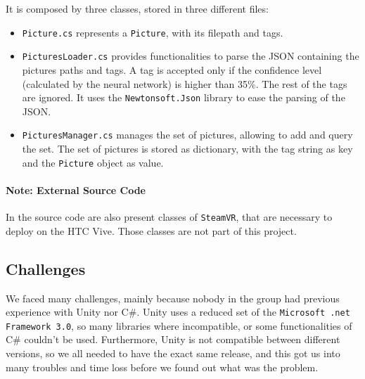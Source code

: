 \documentclass[11pt,a4paper]{article}
\begin{document}
It is composed by three classes, stored in three different files:
\begin{itemize}
\item \texttt{Picture.cs} represents a \texttt{Picture}, with its filepath and tags.
\item \texttt{PicturesLoader.cs} provides functionalities to parse the JSON containing the pictures paths and tags. 
A tag is accepted only if the confidence level (calculated by the neural network) is higher than 35$\%$.
The rest of the tags are ignored.
It uses the \texttt{Newtonsoft.Json} library to ease the parsing of the JSON.
\item \texttt{PicturesManager.cs} manages the set of pictures, allowing to add and query the set. The set of pictures is stored as dictionary, with the tag string as key and the \texttt{Picture} object as value.
\end{itemize}

\paragraph{Note: External Source Code}
In the source code are also present classes of \texttt{SteamVR}, that are necessary to deploy on the HTC Vive.
Those classes are not part of this project.

\subsection{Challenges}







We faced many challenges, mainly because nobody in the group had previous experience with Unity nor C$\#$.
Unity uses a reduced set of the \texttt{Microsoft .net Framework 3.0}, so many libraries where incompatible, or some functionalities of C$\#$ couldn't be used.
Furthermore, Unity is not compatible between different versions, so we all needed to have the exact same release, and this got us into many troubles and time loss before we found out what was the problem.
\end{document}
